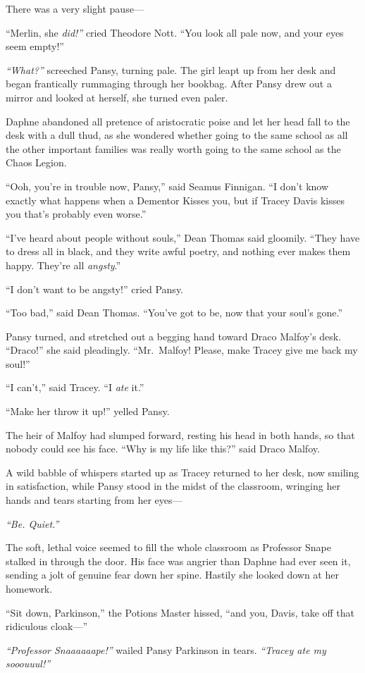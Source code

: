 There was a very slight pause---

``Merlin, she \emph{did!''} cried Theodore Nott. ``You look all pale
now, and your eyes seem empty!''

\emph{``What?''} screeched Pansy, turning pale. The girl leapt up from
her desk and began frantically rummaging through her bookbag. After
Pansy drew out a mirror and looked at herself, she turned even paler.

Daphne abandoned all pretence of aristocratic poise and let her head
fall to the desk with a dull thud, as she wondered whether going to the
same school as all the other important families was really worth going
to the same school as the Chaos Legion.

``Ooh, you're in trouble now, Pansy,'' said Seamus Finnigan. ``I don't
know exactly what happens when a Dementor Kisses you, but if Tracey
Davis kisses you that's probably even worse.''

``I've heard about people without souls,'' Dean Thomas said gloomily.
``They have to dress all in black, and they write awful poetry, and
nothing ever makes them happy. They're all \emph{angsty}.''

``I don't want to be angsty!'' cried Pansy.

``Too bad,'' said Dean Thomas. ``You've got to be, now that your soul's
gone.''

Pansy turned, and stretched out a begging hand toward Draco Malfoy's
desk. ``Draco!'' she said pleadingly. ``Mr.~Malfoy! Please, make Tracey
give me back my soul!''

``I can't,'' said Tracey. ``I \emph{ate} it.''

``Make her throw it up!'' yelled Pansy.

The heir of Malfoy had slumped forward, resting his head in both hands,
so that nobody could see his face. ``Why is my life like this?'' said
Draco Malfoy.

A wild babble of whispers started up as Tracey returned to her desk, now
smiling in satisfaction, while Pansy stood in the midst of the
classroom, wringing her hands and tears starting from her eyes---

\emph{``Be. Quiet.''}

The soft, lethal voice seemed to fill the whole classroom as Professor
Snape stalked in through the door. His face was angrier than Daphne had
ever seen it, sending a jolt of genuine fear down her spine. Hastily she
looked down at her homework.

``Sit down, Parkinson,'' the Potions Master hissed, ``and you, Davis,
take off that ridiculous cloak---''

\emph{``Professor Snaaaaaape!''} wailed Pansy Parkinson in tears.
\emph{``Tracey ate my sooouuul!''}

